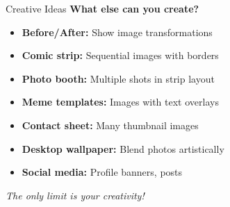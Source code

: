 \documentclass{csbeamer}
\begin{document}
\begin{frame}{Creative Ideas}
    \textbf{What else can you create?}

    \vspace{1em}

    \begin{itemize}
        \item \textbf{Before/After:} Show image transformations
        \item \textbf{Comic strip:} Sequential images with borders
        \item \textbf{Photo booth:} Multiple shots in strip layout
        \item \textbf{Meme templates:} Images with text overlays
        \item \textbf{Contact sheet:} Many thumbnail images
        \item \textbf{Desktop wallpaper:} Blend photos artistically
        \item \textbf{Social media:} Profile banners, posts
    \end{itemize}

    \vspace{1em}

    \begin{center}
        \textit{The only limit is your creativity!}
    \end{center}
\end{frame}
\end{document}
